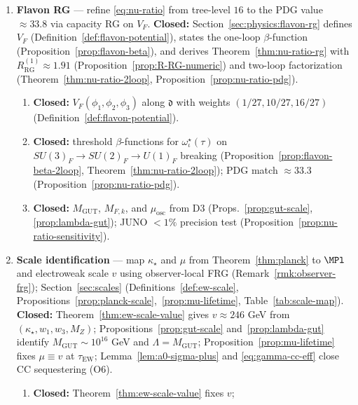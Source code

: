 \begin{enumerate}[label=\textbf{D\arabic*.},leftmargin=*]
  \item \textbf{Flavon RG} --- refine \eqref{eq:nu-ratio} from tree-level
    $16$ to the PDG value $\approx 33.8$ via capacity RG on $V_F$.
    \textbf{Closed:} Section~\ref{sec:physics:flavon-rg} defines
    $V_F$ (Definition~\ref{def:flavon-potential}), states the one-loop
    $\beta$-function (Proposition~\ref{prop:flavon-beta}), and derives
    Theorem~\ref{thm:nu-ratio-rg} with $R_{\mathrm{RG}}^{(1)}\approx 1.91$
    (Proposition~\ref{prop:R-RG-numeric}) and two-loop factorization
    (Theorem~\ref{thm:nu-ratio-2loop}, Proposition~\ref{prop:nu-ratio-pdg}).
    \begin{enumerate}[label=\textit{D2.\alph*.},leftmargin=2em]
      \item \textbf{Closed:} $V_F(\phi_1,\phi_2,\phi_3)$ along
        $\mathfrak{d}$ with weights $(1/27,10/27,16/27)$
        (Definition~\ref{def:flavon-potential}).
      \item \textbf{Closed:} threshold $\beta$-functions for
        $\omega^\star_\iota(\tau)$ on $SU(3)_F\to SU(2)_F\to U(1)_F$
        breaking (Proposition~\ref{prop:flavon-beta-2loop},
        Theorem~\ref{thm:nu-ratio-2loop}); PDG match
        $\approx 33.3$ (Proposition~\ref{prop:nu-ratio-pdg}).
      \item \textbf{Closed:} $M_{\mathrm{GUT}}$, $M_{F,k}$, and
        $\mu_{\mathrm{osc}}$ from D3 (Props.~\ref{prop:gut-scale},
        \ref{prop:lambda-gut}); JUNO $<1\%$ precision test
        (Proposition~\ref{prop:nu-ratio-sensitivity}).
    \end{enumerate}
  \item \textbf{Scale identification} --- map $\kappa_\star$ and $\mu$ from
    Theorem~\ref{thm:planck} to $\MPl$ and electroweak scale $v$ using
    observer-local FRG (Remark~\ref{rmk:observer-frg});
    Section~\ref{sec:scales} (Definitions~\ref{def:ew-scale},
    Propositions~\ref{prop:planck-scale},~\ref{prop:mu-lifetime},
    Table~\ref{tab:scale-map}).
    \textbf{Closed:} Theorem~\ref{thm:ew-scale-value} gives
    $v\approx 246$ GeV from $(\kappa_\star,w_1,w_3,M_Z)$;
    Propositions~\ref{prop:gut-scale} and~\ref{prop:lambda-gut} identify
    $M_{\mathrm{GUT}}\sim 10^{16}$ GeV and $\Lambda=M_{\mathrm{GUT}}$;
    Proposition~\ref{prop:mu-lifetime} fixes $\mu\equiv v$ at
    $\tau_{\mathrm{EW}}$; Lemma~\ref{lem:a0-sigma-plus} and
    \eqref{eq:gamma-cc-eff} close CC sequestering (O6).
    \begin{enumerate}[label=\textit{D3.\alph*.},leftmargin=2em]
      \item \textbf{Closed:} Theorem~\ref{thm:ew-scale-value} fixes $v$;

\end{enumerate}
\end{enumerate}
